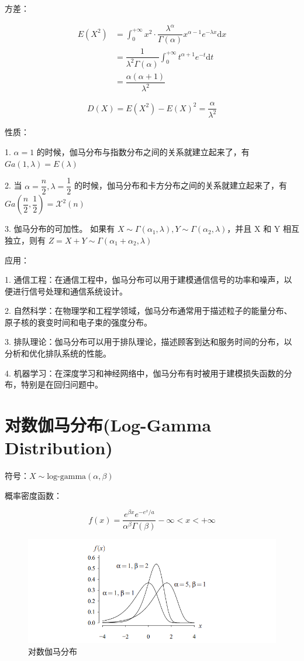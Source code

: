\documentclass[12pt, a4paper, oneside]{ctexbook}
\begin{document}
 方差：

$$
\begin{aligned}
E(X^{2}) &= \int_{0}^{+\infty} x^{2} \cdot \dfrac{\lambda^{\alpha}}{\Gamma(\alpha)} x^{\alpha - 1}e^{-\lambda x} \mathrm{d}x \\
&= \dfrac{1}{\lambda^{2}\Gamma(\alpha)} \int_0^{+\infty} t^{\alpha+1}e^{-t}\mathrm{d}t \\
&= \dfrac{\alpha(\alpha + 1)}{\lambda^{2}}
\end{aligned}
$$

$$
D(X) = E(X^{2}) - E(X)^{2}  = \dfrac{\alpha}{\lambda^{2}}
$$

 性质：

1. $\alpha  = 1$ 的时候，伽马分布与指数分布之间的关系就建立起来了，有 $Ga(1, \lambda ) = E(\lambda)$

2. 当 $\alpha = \dfrac{n}{2}, \lambda = \dfrac{1}{2}$ 的时候，伽马分布和卡方分布之间的关系就建立起来了，有 $Ga(\dfrac{n}{2}, \dfrac{1}{2}) = \mathcal{X}^{2}(n)$

3. 伽马分布的可加性。
   如果有 $X \sim \Gamma(\alpha_1, \lambda), Y \sim \Gamma(\alpha_2, \lambda)$，并且 X 和 Y 相互独立，则有 $Z = X + Y \sim \Gamma(\alpha_1 + \alpha_2, \lambda)$

 应用：

1. 通信工程：在通信工程中，伽马分布可以用于建模通信信号的功率和噪声，以便进行信号处理和通信系统设计。

2. 自然科学：在物理学和工程学领域，伽马分布通常用于描述粒子的能量分布、原子核的衰变时间和电子束的强度分布。

3. 排队理论：伽马分布可以用于排队理论，描述顾客到达和服务时间的分布，以分析和优化排队系统的性能。

4. 机器学习：在深度学习和神经网络中，伽马分布有时被用于建模损失函数的分布，特别是在回归问题中。


\section{对数伽马分布(Log-Gamma Distribution)}
 符号：$X \sim \text{log-gamma}(\alpha, \beta)$

 概率密度函数：

$$
f(x) = \dfrac{e^{\beta x}e^{-e^{x} / a}}{\alpha^{\beta}\Gamma(\beta)} -\infty < x < +\infty
$$
\begin{figure}[H]
  \centering
  \includegraphics[width=1\textwidth]{image/对数伽马分布.png}
  \caption{对数伽马分布}
  \label{fig:example}
\end{figure}
\end{document}
